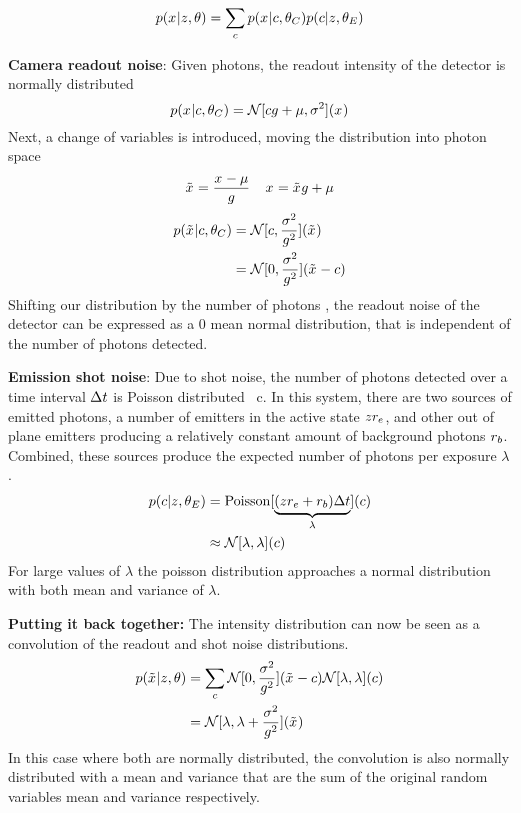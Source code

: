   \begin{equation}
    p(x_{}|z_{},\theta) = \sum_c p(x_{}|c,\theta_C)p(c|z_{},\theta_E)
  \end{equation}

\textbf{Camera readout noise}:
  Given \photons photons, the readout intensity of the detector is normally distributed
  \begin{equation}
    p(x_{}|c,\theta_C) = \mathcal{N}[cg + \mu, \sigma^2](x_{})
  \end{equation}
  Next, a change of variables is introduced, moving the distribution into photon space
  \begin{equation}
    \tilde{x}_{} = \frac{x_{} - \mu}{g}
    \;\;\;\;
    x_{} = \tilde{x}_{}g + \mu
  \end{equation}
  \begin{align}
    p(\tilde{x}_{}|c,\theta_C)
      &= \mathcal{N}[c, \frac{\sigma^2}{g^2}](\tilde{x}_{}) \\
      &= \mathcal{N}[0, \frac{\sigma^2}{g^2}](\tilde{x}_{} - c)
  \end{align}
  Shifting our distribution by the number of photons \photons, the readout noise of the detector can be expressed as a 0 mean 
  normal distribution, that is independent of the number of photons detected.

\textbf{Emission shot noise}:
  Due to shot noise, the number of photons detected over a time interval $\Delta t$ is Poisson
  distributed~\cite{mehta_poisson_2016} c. In this system, there are two sources of emitted photons, a number of emitters in the active state $z_{}r_e$,
  and other out of plane emitters producing a relatively constant amount of background photons $r_b$. Combined, 
  these sources produce the expected number of photons per exposure $\lambda$.
  \begin{align}
    p(c|z_{},\theta_E)
      &= \operatorname{Poisson}[\underbrace{(z_{}r_e + r_b)\Delta t}_{\lambda}](c) \\
      &\approx \mathcal{N}[\lambda, \lambda](c)
  \end{align}
  For large values of $\lambda$ the poisson distribution approaches a normal distribution with both mean and variance of $\lambda$.

\textbf{Putting it back together:}
The intensity distribution can now be seen as a convolution of the readout and shot noise distributions.
  \begin{align}
    p(\tilde{x}_{}|z_{},\theta)
      &= \sum_c
        \mathcal{N}[0, \frac{\sigma^2}{g^2}](\tilde{x}_{} - c)
        \mathcal{N}[\lambda, \lambda](c) \\
      &= \mathcal{N}[\lambda, \lambda + \frac{\sigma^2}{g^2}](\tilde{x}_{})
  \end{align}
  In this case where both are normally distributed, the convolution is also normally distributed with 
  a mean and variance that are the sum of the original random variables mean and variance respectively. 

